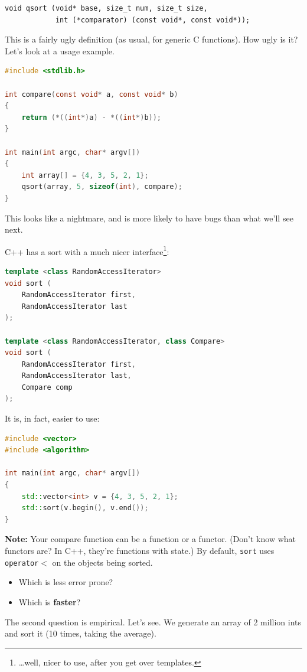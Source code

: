 \documentclass[a4paper]{report}
\begin{document}
  \begin{lstlisting}
void qsort (void* base, size_t num, size_t size,
            int (*comparator) (const void*, const void*));
  \end{lstlisting}

This is a fairly ugly definition (as usual, for generic C functions). How ugly is it?
Let's look at a usage example.
  \begin{lstlisting}[language=C]
#include <stdlib.h>

int compare(const void* a, const void* b)
{
    return (*((int*)a) - *((int*)b));
}

int main(int argc, char* argv[])
{
    int array[] = {4, 3, 5, 2, 1};
    qsort(array, 5, sizeof(int), compare);
}
  \end{lstlisting}
This looks like a nightmare, and is more likely to have bugs than what we'll see next.


C++ has a sort with a much nicer interface\footnote{\ldots well, nicer to use, after you get over templates.}:

  \begin{lstlisting}[language=C++]
template <class RandomAccessIterator>
void sort (
    RandomAccessIterator first,
    RandomAccessIterator last
);

template <class RandomAccessIterator, class Compare>
void sort (
    RandomAccessIterator first,
    RandomAccessIterator last,
    Compare comp
);
  \end{lstlisting}
It is, in fact, easier to use:
  \begin{lstlisting}[language=C++]
#include <vector>
#include <algorithm>

int main(int argc, char* argv[])
{
    std::vector<int> v = {4, 3, 5, 2, 1};
    std::sort(v.begin(), v.end());
}
  \end{lstlisting}

{\bf Note:} Your compare function can be a function or a functor. (Don't know what functors
are? In C++, they're functions with state.) By default,
  {\tt sort} uses {\tt operator$<$} on the objects being sorted.

  \begin{itemize}
    \item Which is less error prone?
    \item Which is {\bf faster}?
  \end{itemize}

The second question is empirical. Let's see. We generate an array of 2 million ints
and sort it (10 times, taking the average).
\end{document}
